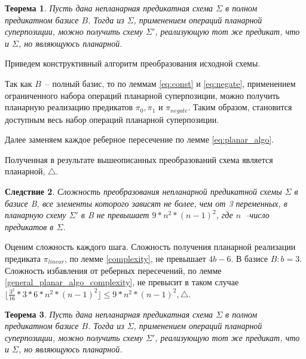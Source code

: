 \documentclass[12pt]{article}
\newtheorem{theorem}{Теорема}[section]
\newtheorem{corollary}[theorem]{Следствие}
\newenvironment{proof}[1][Доказательство]{\begin{trivlist}
\item[\hskip \labelsep {\bfseries #1}]}{\end{trivlist}}
\begin{document}
\begin{theorem}
\label{Theo1}
Пусть дана непланарная предикатная схема $\Sigma$ в полном предикатном базисе $B$. 
Тогда из $\Sigma$, применением операций планарной суперпозиции, можно получить схему $\Sigma'$,
реализующую тот же предикат, что и $\Sigma$, но являющуюсь планарной.
\end{theorem}
\begin{proof}
Приведем конструктивный алгоритм преобразования исходной схемы.

Так как $B$~-- полный базис, то по леммам \ref{eq:const} и \ref{eq:negate}, применением ограниченного набора операций планарной
суперпозиции, можно получить планарную реализацию предикатов $\pi_0, \pi_1$ и $\pi_{negate}$. 
Таким образом, становится доступным весь набор операций планарной суперпозиции. 

Далее заменяем каждое реберное пересечение по лемме \ref{eq:planar_algo}. 

Полученная в результате вышеописанных преобразований схема является планарной, $\bigtriangleup$.
\end{proof}
\begin{corollary}
Сложность преобразования непланарной предикатной схемы $\Sigma$ в базисе B, 
все элементы которого зависят не более, чем от 3 переменных, 
в планарную схему $\Sigma'$ в B не превышает $9 * n^2 * (n-1)^2$, где $n$~--число предикатов в $\Sigma$.
\end{corollary}
\begin{proof}
Оценим сложность каждого шага. Сложность получения планарной реализации предиката $\pi_{linear}$, по лемме \ref{complexity},
не превышает $4b - 6$. В базисе $B: b=3$. Сложность избавления от реберных пересечений, по лемме \ref{general_planar_algo_complexity}, не 
превысит в таком случае $\lfloor \frac{3^2}{16} * 3 * 6 * n^2 * (n-1)^2 \rfloor \le 9 * n^2 * (n-1)^2, \bigtriangleup$.
\end{proof}

\begin{theorem}
Пусть дана непланарная предикатная схема $\Sigma$ в полном предикатном базисе $B$. 
Тогда из $\Sigma$, применением операций планарной суперпозиции, можно получить схему $\Sigma'$,
реализующую тот же предикат, что и $\Sigma$, но являющуюсь планарной.
\end{theorem}
\end{document}
